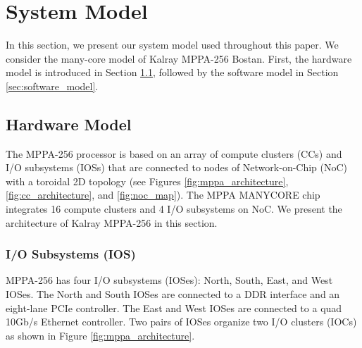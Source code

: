 \documentclass{sig-alternate-05-2015}
\begin{document}
\section{System Model}
\label{sec:system_model}
In this section, we present our system model used throughout this paper.
We consider the many-core model of Kalray MPPA-256 Bostan.
First, the hardware model is introduced in Section \ref{sec:hardware_model},
followed by the software model in Section \ref{sec:software_model}.

\subsection{Hardware Model}
\label{sec:hardware_model}
The MPPA-256 processor is based on an array of compute clusters (CCs) and I/O subsystems (IOSs) that are connected to nodes of Network-on-Chip (NoC) with a toroidal 2D topology 
(see Figures \ref{fig:mppa_architecture}, \ref{fig:cc_architecture}, and \ref{fig:noc_map}).
The MPPA MANYCORE chip integrates 16 compute clusters and 4 I/O subsystems on NoC.
We present the architecture of Kalray MPPA-256 in this section.

\subsubsection{I/O Subsystems (IOS)}
\label{sec:ios}
MPPA-256 has four I/O subsystems (IOSes): North, South, East, and West IOSes.
The North and South IOSes are connected to a DDR interface and an eight-lane PCIe controller.
The East and West IOSes are connected to a quad 10Gb/s Ethernet controller.
Two pairs of IOSes organize two I/O clusters (IOCs) as shown in Figure \ref{fig:mppa_architecture}.
\end{document}
